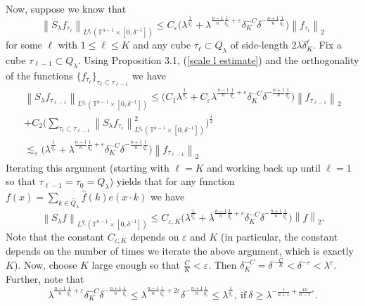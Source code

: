 \documentclass[11pt]{amsart}
\numberwithin{equation}{section}
\newcommand{\Tn}{\mathbb{T}^{n-1}}
\newcommand{\la}{\lambda}
\newcommand\norm[1]{\left\lVert#1\right\rVert}
\newcommand{\lpnorm}[3]{\norm{#1}_{L^{#2}(#3)}}
\newcommand{\altlpnorm}[2]{\norm{#1}_{#2}}
\newcommand{\Sl}{S_{\la}}
\newcommand{\dK}[1]{\delta_{K}^{#1}}
\begin{document}
Now, suppose we know that 
\begin{equation} \label{scale l estimate}
    \lpnorm{\Sl f_{\tau_{\ell}}}{q_c}{\Tn\times[0, \delta^{-1}]} \leq C_{\varepsilon}\big( \la^{\frac{1}{q_c}} + \la^{\frac{n-1}{n}\frac{1}{q_c} + \varepsilon}\dK{-C}\delta^{-\frac{n+1}{n}\frac{1}{q_c}}\big)\altlpnorm{f_{\tau_{\ell}}}{2}
\end{equation}
for some $\ell$ with $1 \leq \ell \leq K$ and any cube $\tau_{\ell} \subset Q_{\la}$ of side-length $2\la \dK{\ell}$. Fix a cube $\tau_{\ell - 1} \subset Q_{\la}$. Using Proposition 3.1, (\ref{scale l estimate}) and the orthogonality of the functions $\{f_{\tau_{\ell}}\}_{\tau_{\ell}\subset \tau_{\ell - 1}}$ we have
\begin{equation}
\begin{split}
    \lpnorm{\Sl f_{\tau_{\ell-1}}}{q_c}{\Tn\times[0, \delta^{-1}]} \leq \big(C_1 \la^{\frac{1}{q_c}} + C_{\varepsilon}\la^{\frac{n-1}{n}\frac{1}{q_c} + \varepsilon}\dK{-C}\delta^{-\frac{n+1}{n}\frac{1}{q_c}}\big)\altlpnorm{f_{\tau_{\ell-1}}}{2} \\
    + C_2\Big(\sum_{\tau_{\ell} \subset \tau_{\ell-1}}\lpnorm{\Sl f_{\tau_{\ell}}}{q_c}{\Tn \times [0, \delta^{-1}]}^{2}\Big)^{\frac{1}{2}} \\
    \lesssim_{\varepsilon}\big( \la^{\frac{1}{q_c}} +\la^{\frac{n-1}{n}\frac{1}{q_c} + \varepsilon}\dK{-C}\delta^{-\frac{n+1}{n}\frac{1}{q_c}}\big)\altlpnorm{f_{\tau_{\ell-1}}}{2}
\end{split}
\end{equation}
Iterating this argument (starting with $\ell = K$ and working back up until $\ell = 1$ so that $\tau_{\ell - 1} = \tau_{0} = Q_{\la}$) yields that for any function $ f(x) = \sum_{k \in \tilde{Q_{\la}}}\widehat{f}(k)e(x \cdot k)$ we have
\begin{equation}
    \lpnorm{\Sl f}{q_c}{\Tn \times [0, \delta^{-1}]} \leq C_{\varepsilon, K}\big( \la^{\frac{1}{q_c}} +\la^{\frac{n-1}{n}\frac{1}{q_c} + \varepsilon}\dK{-C}\delta^{-\frac{n+1}{n}\frac{1}{q_c}}\big)\altlpnorm{f}{2}.
\end{equation}
Note that the constant $C_{\varepsilon, K}$ depends on $\varepsilon$ and $K$ (in particular, the constant depends on the  number of times we iterate the above argument, which is exactly $K$). Now, choose $K$ large enough so that $\frac{C}{K} < \varepsilon$. Then $\dK{-C} = \delta^{-\frac{C}{K}} < \delta^{-\varepsilon} < \la^{\varepsilon}$. Further, note that 
\begin{equation}
    \la^{\frac{n-1}{n}\frac{1}{q_c} + \varepsilon}\dK{-C}\delta^{-\frac{n+1}{n}\frac{1}{q_c}} \leq \la^{\frac{n-1}{n}\frac{1}{q_c} + 2\varepsilon}\delta^{-\frac{n+1}{n}\frac{1}{q_c}} \leq \la^{\frac{1}{q_c}}, \ \text{if} \ \delta \geq \la^{-\frac{1}{n+1} + \frac{4n}{n-1}\varepsilon}.  
\end{equation}
\end{document}

